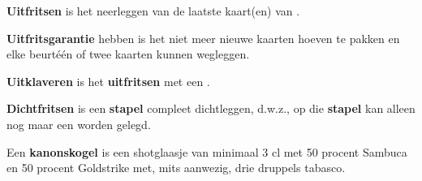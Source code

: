 \item \label{definitie:uitfritsen} \textbf{Uitfritsen} is het neerleggen van de laatste kaart(en) van \eenSpelerN.

\item  \label{definitie:uitfritsgarantie} \textbf{Uitfritsgarantie} hebben is het niet meer nieuwe kaarten hoeven te pakken en elke beurt\footnotemark[1] \'e\'en of twee kaarten kunnen wegleggen.

\item \label{definitie:uitklaver} \textbf{Uitklaveren} is het \textbf{uitfritsen} met een \footnotemark[4].

\item \textbf{Dichtfritsen} is een \textbf{stapel} compleet dichtleggen, d.w.z., op die \textbf{stapel} kan alleen nog maar een  worden gelegd.

\item \label{definitie:kanonskogel} Een \textbf{kanonskogel} is een shotglaasje van minimaal 3 cl met 50 procent Sambuca en 50 procent Goldstrike met, mits aanwezig, drie druppels tabasco.

\eindABCLijst


